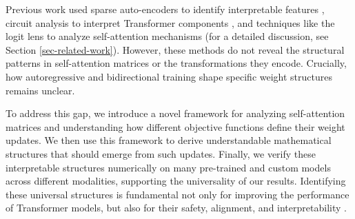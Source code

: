 %
Previous work used sparse auto-encoders to identify interpretable features \citep{Huben_Cunningham_Smith_Ewart_Sharkey_2024, bricken2023monosemanticity}, circuit analysis to interpret Transformer components \citep{olahZoomIntroductionCircuits2020,elhageMathematicalFrameworkTransformer2021,olahMechanisticInterpretabilityVariables2022}, and techniques like the logit lens to analyze self-attention mechanisms \citep{Geva_Schuster_2021, darAnalyzingTransformersEmbedding2023} (for a detailed discussion, see Section \ref{sec-related-work}).
%
%
%
%
%
%
%
However, these methods do not reveal the structural patterns in self-attention matrices or the transformations they encode.
% 
Crucially, how autoregressive and bidirectional training shape specific weight structures remains unclear.


%
To address this gap, we introduce a novel framework for analyzing self-attention matrices and understanding how different objective functions define their weight updates.
%
We then use this framework to derive understandable mathematical structures that should emerge from such updates. 
%
Finally, we verify these interpretable structures numerically on many pre-trained and custom models across different modalities, supporting the universality of our results.
%
Identifying these universal structures is fundamental not only for improving the performance of Transformer models, but also for their safety, alignment, and interpretability \citep{olahMechanisticInterpretabilityVariables2022}.

